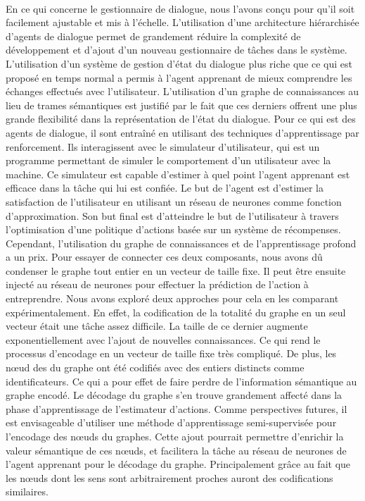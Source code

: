\paragraph{}
En ce qui concerne le gestionnaire de dialogue, nous l'avons conçu pour qu'il soit facilement ajustable et mis à l'échelle. L'utilisation d'une architecture hiérarchisée d'agents de dialogue permet de grandement réduire la complexité de développement et d'ajout d'un nouveau gestionnaire de tâches dans le système. L'utilisation d'un système de gestion d'état du dialogue plus riche que ce qui est proposé en temps normal a permis à l'agent apprenant de mieux comprendre les échanges effectués avec l'utilisateur. L'utilisation d'un graphe de connaissances au lieu de trames sémantiques est justifié par le fait que ces derniers offrent une plus grande flexibilité dans la représentation de l'état du dialogue. Pour ce qui est des agents de dialogue, il sont entraîné en utilisant des techniques d'apprentissage par renforcement. Ils interagissent avec le simulateur d'utilisateur, qui est un programme permettant de simuler le comportement d'un utilisateur avec la machine. Ce simulateur est capable d'estimer à quel point l'agent apprenant est efficace dans la tâche qui lui est confiée. Le but de l'agent est d'estimer la satisfaction de l'utilisateur en utilisant un réseau de neurones comme fonction d'approximation. Son but final est d'atteindre le but de l'utilisateur à travers l'optimisation d'une politique d'actions basée sur un système de récompenses.
Cependant, l'utilisation du graphe de connaissances et de l'apprentissage profond a un prix. Pour essayer de connecter ces deux composants, nous avons dû condenser le graphe tout entier en un vecteur de taille fixe. Il peut être ensuite injecté au réseau de neurones pour effectuer la prédiction de l'action à entreprendre. Nous avons exploré deux approches pour cela en les comparant expérimentalement. En effet, la codification de la totalité du graphe en un seul vecteur était une tâche assez difficile. La taille de ce dernier augmente exponentiellement avec l'ajout de nouvelles connaissances. Ce qui rend le processus d'encodage en un vecteur de taille fixe très compliqué. De plus, les n\oe{}ud des du graphe ont été codifiés avec des entiers distincts comme identificateurs. Ce qui a pour effet de faire perdre de l'information sémantique au graphe encodé. Le décodage du graphe s'en trouve grandement affecté dans la phase d'apprentissage de l'estimateur d'actions. Comme perspectives futures, il est envisageable d'utiliser une méthode d'apprentissage semi-supervisée pour l'encodage des n\oe{}uds du graphes. Cette ajout pourrait permettre d'enrichir la valeur sémantique de ces n\oe{}uds, et facilitera la tâche au réseau de neurones de l'agent apprenant pour le décodage du graphe. Principalement grâce au fait que les n\oe{}uds dont les sens sont arbitrairement proches auront des codifications similaires.

